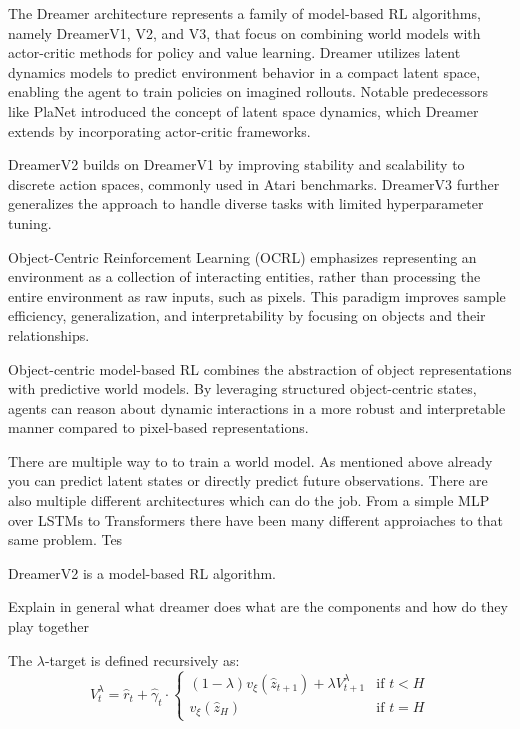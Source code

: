 \documentclass[
	english,
	ruledheaders=section,
	class=report,
	thesis={type=master},
	accentcolor=9c,
	custommargins=true,
	marginpar=false,
	parskip=half-,
	fontsize=11pt,
]{tudapub}
\begin{document}
The Dreamer architecture represents a family of model-based RL algorithms, namely DreamerV1, V2, and V3,
 that focus on combining world models with actor-critic methods for policy and value learning. Dreamer
  utilizes latent dynamics models to predict environment behavior in a compact latent space, enabling
   the agent to train policies on imagined rollouts. Notable predecessors like PlaNet introduced the 
   concept of latent space dynamics, which Dreamer extends by incorporating actor-critic frameworks.

DreamerV2 builds on DreamerV1 by improving stability and scalability to discrete action spaces,
 commonly used in Atari benchmarks. DreamerV3 further generalizes the approach to handle diverse 
 tasks with limited hyperparameter tuning.



Object-Centric Reinforcement Learning (OCRL) emphasizes representing an environment as a collection of interacting entities, rather than processing the entire environment as raw inputs, such as pixels. This paradigm improves sample efficiency, generalization, and interpretability by focusing on objects and their relationships.

Object-centric model-based RL combines the abstraction of object representations with predictive world models. By leveraging structured object-centric states, agents can reason about dynamic interactions in a more robust and interpretable manner compared to pixel-based representations.


There are multiple way to to train a world model. As mentioned above already you can predict latent states or directly predict future observations. There are also multiple different architectures which can do the job. From a simple MLP over LSTMs to Transformers there have been many different approiaches to that same problem. Tes

DreamerV2 \cite{hafner2019dreamer} is a model-based RL algorithm.

Explain in general what dreamer does
what are the components and how do they play together

The $\lambda$-target is defined recursively as:
\begin{equation}
	V^{\lambda}_t = \hat{r}_t + \hat{\gamma}_t \cdot \begin{cases}
		(1 - \lambda)v_\xi(\hat{z}_{t+1}) + \lambda V^{\lambda}_{t+1} & \text{if } t < H \\
		v_\xi(\hat{z}_H)                                              & \text{if } t = H
	\end{cases}
\end{equation}
\end{document}
